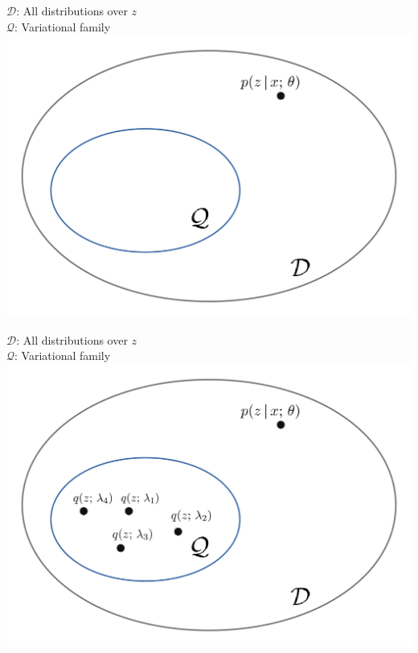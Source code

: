 \begin{frame}
$\mathcal{D}$: All distributions over $z$ \\
$\mathcal{Q}$: Variational family 
\center
\includegraphics[scale=0.26]{pics/vi3.png}
\end{frame}

\begin{frame}
$\mathcal{D}$: All distributions over $z$ \\
$\mathcal{Q}$: Variational family 
\center
\includegraphics[scale=0.26]{pics/vi4.png}
\end{frame}

